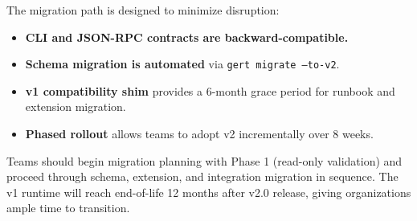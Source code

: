 The migration path is designed to minimize disruption:
\begin{itemize}
  \item \textbf{CLI and JSON-RPC contracts are backward-compatible.}
  \item \textbf{Schema migration is automated} via \texttt{gert migrate --to-v2}.
  \item \textbf{v1 compatibility shim} provides a 6-month grace period for runbook and extension migration.
  \item \textbf{Phased rollout} allows teams to adopt v2 incrementally over 8 weeks.
\end{itemize}

Teams should begin migration planning with Phase 1 (read-only validation) and proceed through schema, extension, and integration migration in sequence. The v1 runtime will reach end-of-life 12 months after v2.0 release, giving organizations ample time to transition.

